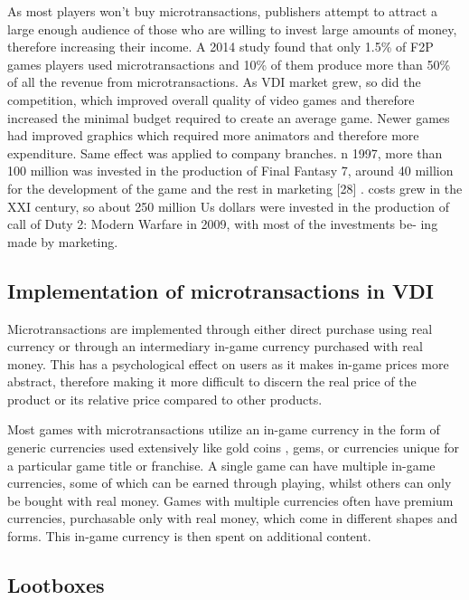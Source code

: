 \documentclass[10pt,british,a4paper,titlepage]{article}
\begin{document}
As most players won’t buy microtransactions, publishers attempt to attract a large enough audience of those who are willing to invest large amounts of money, therefore increasing their income. A 2014 study found that only 1.5\% of F2P games players used microtransactions and 10\% of them produce more than 50\% of all the revenue from microtransactions\cite{tomic2018economic:micro}.
As VDI market grew, so did the competition, which improved overall quality of video games and therefore increased the minimal budget required to create an average game. Newer games had improved graphics which required more animators and therefore more expenditure. Same effect was applied to company branches. n 1997, more than   100 million was invested in the
production of Final Fantasy 7, around 40 million for the
development of the game and the rest in marketing [28] .
costs grew in the XXI century, so about 250 million Us
dollars were invested in the production of call of Duty 2:
Modern Warfare in 2009, with most of the investments be-
ing made by marketing.


\subsection{Implementation of microtransactions in VDI}

Microtransactions are implemented through either direct purchase using real currency or through an intermediary in-game currency purchased with real money. This has a psychological effect on users as it makes in-game prices more abstract, therefore making it more difficult to discern the real price of the product or its relative price compared to other products\cite{tomic2018economic:micro}.

Most games with microtransactions utilize an in-game currency in the form of generic currencies used extensively like gold coins , gems, or currencies unique for a particular game title or franchise. A single game can have multiple in-game currencies, some of which can be earned through playing, whilst others can only be bought with real money. Games with multiple currencies often have premium currencies, purchasable only with real money, which come in different shapes and forms. This in-game currency is then spent on additional content.



\subsection{Lootboxes}
\end{document}
